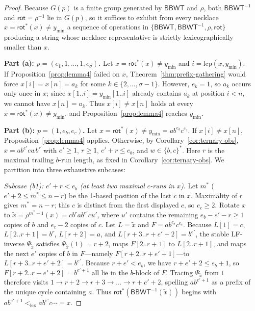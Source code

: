 \documentclass[11pt,a4paper]{article}
\theoremstyle{definition}
\newcommand{\BBWT}{\mathsf{BBWT}}
\newcommand{\rot}{\mathsf{rot}}
\newcommand{\lcp}{\mathrm{lcp}}
\newcommand{\lex}{\mathrm{lex}}
\begin{document}
\begin{proof}
Because $G(p)$ is a finite group generated by $\BBWT$ and $\rho$, both $\BBWT^{-1}$ and $\rot = \rho^{-1}$ lie in $G(p)$, so it suffices to exhibit from every necklace $x = \rot^*(x) \neq y_{\min}$ a sequence of operations in $\{\BBWT, \BBWT^{-1}, \rho, \rot\}$ producing a string whose necklace representative is strictly lexicographically smaller than $x$.

\medskip
\noindent\textbf{Part (a): $p = (e_1, 1, \dots, 1, e_\sigma)$.}
Let $x = \rot^*(x) \neq y_{\min}$ and $i = \lcp(x, y_{\min})$. If Proposition~\ref{prop:lemma4} failed on $x$, Theorem~\ref{thm:prefix-gathering} would force $x[i] = x[n] = a_k$ for some $k \in \{2, \dots, \sigma - 1\}$. However, $e_k = 1$, so $a_k$ occurs only once in $x$; since $x[1..i] = y_{\min}[1..i]$ already contains $a_k$ at position $i < n$, we cannot have $x[n] = a_k$. Thus $x[i] \neq x[n]$ holds at every $x = \rot^*(x) \neq y_{\min}$, and Proposition~\ref{prop:lemma4} reaches $y_{\min}$.

\medskip
\noindent\textbf{Part (b): $p = (1, e_b, e_c)$.}
Let $x = \rot^*(x) \neq y_{\min} = a b^{e_b} c^{e_c}$. If $x[i] \neq x[n]$, Proposition~\ref{prop:lemma4} applies. Otherwise, by Corollary~\ref{cor:ternary-obs}, $x = a b^{e'} c w b^r$ with $e' \ge 1$, $r \ge 1$, $e' + r \le e_b$, and $w\in\{b,c\}^*$. Here $r$ is the maximal trailing $b$-run length, as fixed in Corollary~\ref{cor:ternary-obs}. We partition into three exhaustive subcases:

\emph{Subcase (b1): $e' + r < e_b$ (at least two maximal $c$-runs in $x$).}
Let $m^*$ ($e'+2 \le m^* \le n - r$) be the 1-based position of the last $c$ in $x$. Maximality of $r$ gives $m^*=n-r$; this $c$ is distinct from the first displayed $c$, so $e_c\ge2$. Rotate $x$ to $\tilde{x} = \rho^{m^* - 1}(x) = c b^r a b^{e'} c u'$, where $u'$ contains the remaining $e_b - e' - r \ge 1$ copies of $b$ and $e_c - 2$ copies of $c$. Let $L = \tilde{x}$ and $F = a b^{e_b} c^{e_c}$. Because $L[1] = c$, $L[2..r+1] = b^r$, $L[r+2] = a$, and $L[r+3..r+e'+2] = b^{e'}$, the stable LF-inverse $\Psi_{\tilde{x}}$ satisfies $\Psi_{\tilde{x}}(1) = r + 2$, maps $F[2..r+1]$ to $L[2..r+1]$, and maps the next $e'$ copies of $b$ in $F$---namely $F[r+2..r+e'+1]$---to $L[r+3..r+e'+2] = b^{e'}$. Because $r + e' < e_b$, we have $r + e' + 2 \le e_b + 1$, so $F[r+2..r+e'+2] = b^{e'+1}$ all lie in the $b$-block of $F$. Tracing $\Psi_{\tilde{x}}$ from $1$ therefore visits $1 \to r+2 \to r+3 \to \dots \to r + e' + 2$, spelling $a b^{e'+1}$ as a prefix of the unique cycle containing $a$. Thus $\rot^*(\BBWT^{-1}(\tilde{x}))$ begins with $a b^{e'+1} <_{\lex} a b^{e'} c \cdots = x$.


\end{proof}
\end{document}
